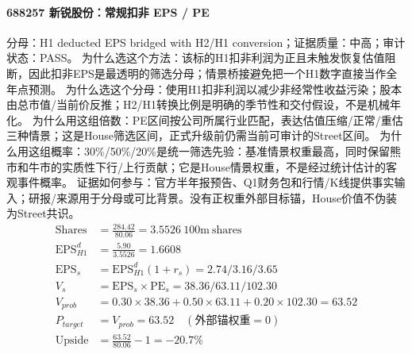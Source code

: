 \paragraph{688257 新锐股份：常规扣非 EPS / PE}
分母：H1 deducted EPS bridged with H2/H1 conversion；证据质量：中高；审计状态：PASS。
为什么选这个方法：该标的H1扣非利润为正且未触发恢复估值阻断，因此扣非EPS是最透明的筛选分母；情景桥接避免把一个H1数字直接当作全年点预测。
为什么选这个分母：使用H1扣非利润以减少非经常性收益污染；股本由总市值/当前价反推；H2/H1转换比例是明确的季节性和交付假设，不是机械年化。
为什么用这组倍数：PE区间按公司所属行业匹配，表达估值压缩/正常/重估三种情景；这是House筛选区间，正式升级前仍需当前可审计的Street区间。
为什么用这组概率：30\%/50\%/20\%是统一筛选先验：基准情景权重最高，同时保留熊市和牛市的实质性下行/上行贡献；它是House情景权重，不是经过统计估计的客观事件概率。
证据如何参与：官方半年报预告、Q1财务包和行情/K线提供事实输入；研报/来源用于分母或可比背景。没有正权重外部目标锚，House价值不伪装为Street共识。
\begin{align*}
\mathrm{Shares} &= \frac{284.42}{80.06}=3.5526\ \mathrm{100m\ shares}\\
\mathrm{EPS}_{H1}^d &= \frac{5.90}{3.5526}=1.6608\\
\mathrm{EPS}_s &= \mathrm{EPS}_{H1}^d(1+r_s)=2.74/3.16/3.65\\
V_s &= \mathrm{EPS}_s\times \mathrm{PE}_s=38.36/63.11/102.30\\
V_{prob} &= 0.30\times 38.36+0.50\times 63.11+0.20\times 102.30=63.52\\
P_{target} &= V_{prob}=63.52\quad(\text{外部锚权重}=0)\\
\mathrm{Upside} &= \frac{63.52}{80.06}-1=-20.7\%\\
\end{align*}


